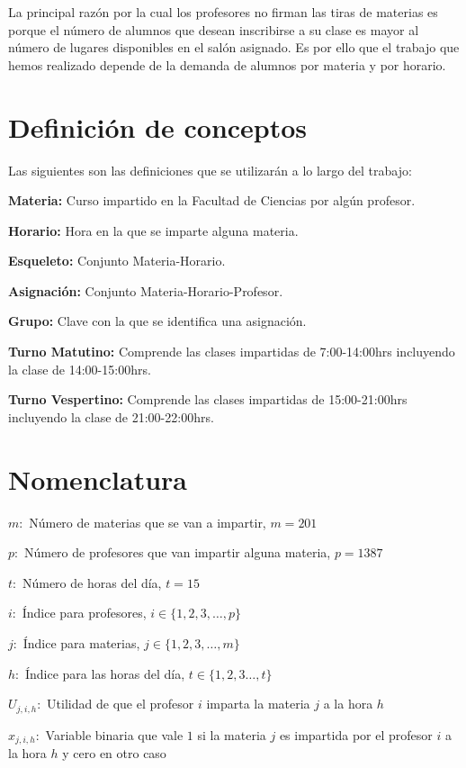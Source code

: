 La principal razón por la cual los profesores no firman las tiras de materias es porque el número de alumnos que desean inscribirse a su clase es mayor al número de lugares disponibles en el salón asignado. Es por ello que el trabajo que hemos realizado depende de la demanda de alumnos por materia y por horario.



\section{Definición de conceptos}

Las siguientes son las definiciones que se utilizarán a lo largo del trabajo:
  
\textbf{Materia:} Curso impartido en la Facultad de Ciencias por algún profesor.

\textbf{Horario:} Hora en la que se imparte alguna materia.

\textbf{Esqueleto:} Conjunto Materia-Horario.

\textbf{Asignación:} Conjunto Materia-Horario-Profesor.

\textbf{Grupo:} Clave con la que se identifica una asignación.

\textbf{Turno Matutino:} Comprende las clases impartidas de 7:00-14:00hrs incluyendo la clase de 14:00-15:00hrs.

\textbf{Turno Vespertino:} Comprende las clases impartidas de 15:00-21:00hrs incluyendo la clase de 21:00-22:00hrs.


\section{Nomenclatura}

$m:$ Número de materias que se van a impartir, $m = 201$

$p:$ Número de profesores que van impartir alguna materia, $p = 1387$

$t:$ Número de horas del día, $t = 15$

$i:$ Índice para profesores, $i \in \{ 1, 2, 3, \ldots, p \}$
  
$j:$ Índice para materias, $j \in \{ 1, 2, 3, \ldots, m \}$
  
$h:$ Índice para las horas del día, $t \in \{ 1, 2, 3 \ldots, t\}$
  
$U_{j,i,h}:$ Utilidad de que el profesor $i$ imparta la materia $j$ a la hora $h$
  
$x_{j,i,h}:$ Variable binaria que vale $1$ si la materia $j$ es impartida por el profesor $i$ a la hora $h$ y cero en otro caso


